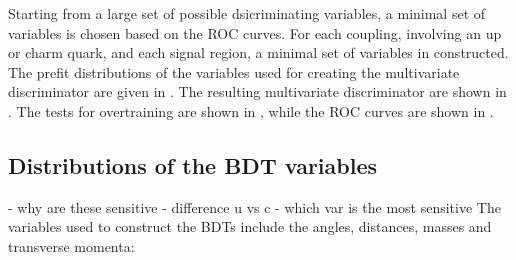 Starting from a large set of possible dsicriminating variables, a minimal set of variables is chosen based on the ROC curves. For each coupling, involving an up or charm quark, and each signal region, a minimal set of variables in constructed. The prefit distributions of the variables used for creating the multivariate discriminator are given in . The resulting multivariate discriminator are shown in .  The tests for overtraining are shown in , while the ROC curves are shown in .

\subsection{Distributions of the BDT variables}
\label{sec:BDTvars}
- why are these sensitive
- difference u vs c
- which var is the most sensitive
The variables used to construct the BDTs include the angles, distances, masses and transverse momenta:
